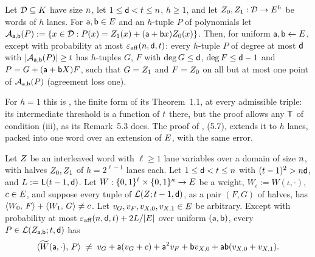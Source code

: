 
\begin{theorem}\label{thm:mca-affine}
Let $\mathcal{D}\subseteq K$ have size $n$, let $1\le\mathsf{d}<t\le n$, $h\ge1$, and let $Z_0,Z_1:\mathcal{D}\to E^h$ be words of $h$ lanes. For $\mathsf{a},\mathsf{b}\in E$ and an $h$-tuple $P$ of polynomials let $\mathcal{A}_{\mathsf{a},\mathsf{b}}(P):=\{x\in\mathcal{D}:P(x)=Z_1(x)+(\mathsf{a}+\mathsf{b} x)Z_0(x)\}$. Then, for uniform $\mathsf{a},\mathsf{b}\leftarrow E$, except with probability at most $\varepsilon_{\mathrm{aff}}(n,\mathsf{d},t)$: every $h$-tuple $P$ of degree at most $\mathsf{d}$ with $|\mathcal{A}_{\mathsf{a},\mathsf{b}}(P)|\ge t$ has $h$-tuples $G$, $F$ with $\deg G\le\mathsf{d}$, $\deg F\le\mathsf{d}-1$ and $P=G+(\mathsf{a}+\mathsf{b} X)F$, such that $G=Z_1$ and $F=Z_0$ on all but at most one point of $\mathcal{A}_{\mathsf{a},\mathsf{b}}(P)$ (agreement loss one).
\end{theorem}

For $h=1$ this is \cite[Thm.~4.10]{CWYZ26}, the finite form of its Theorem~1.1, at every admissible triple: its intermediate threshold is a function of $t$ there, but the proof allows any $\mathsf{T}$ of condition (iii), as its Remark~5.3 does. The proof of \cite[Thm.~5.2]{CWYZ26}, (5.7), extends it to $h$ lanes, packed into one word over an extension of $E$, with the same error.

\begin{lemma}\label{lem:fold-list}
Let $Z$ be an interleaved word with $\ell\ge1$ lane variables over a domain of size $n$, with halves $Z_0,Z_1$ of $h=2^{\ell-1}$ lanes each. Let $1\le\mathsf{d}<t\le n$ with $(t-1)^2>n\mathsf{d}$, and $L:=\mathsf{L}(t-1,\mathsf{d})$. Let $W:\{0,1\}^{\ell}\times\{0,1\}^{\kappa}\to E$ be a weight, $W_\iota:=W(\iota,\cdot)$, $c\in E$, and suppose every tuple of $\mathcal{L}(Z;t-1,\mathsf{d})$, as a pair $(F,G)$ of halves, has $\langle W_0,\, F \rangle+\langle W_1,\, G \rangle\neq c$. Let $v_G,v_F,v_{X,0},v_{X,1}\in E$ be arbitrary. Except with probability at most $\varepsilon_{\mathrm{aff}}(n,\mathsf{d},t)+2L/|E|$ over uniform $(\mathsf{a},\mathsf{b})$, every $P\in\mathcal{L}(Z_{\mathsf{a},\mathsf{b}};t,\mathsf{d})$ has
\[
\langle \widetilde{W}(\mathsf{a},\cdot),\, P \rangle\;\neq\;v_G+\mathsf{a}(v_G+c)+\mathsf{a}^2v_F+\mathsf{b}v_{X,0}+\mathsf{a}\mathsf{b}(v_{X,0}+v_{X,1}).
\]
\end{lemma}

